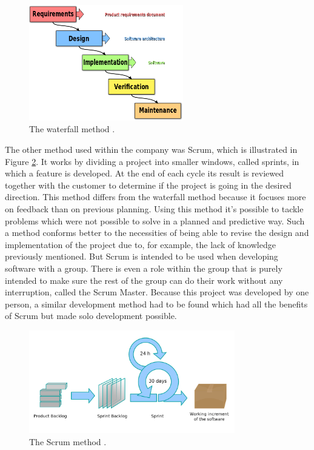 \begin{figure}[ht]
    \centering
    \includegraphics[width=0.6\textwidth]{plaatjes/waterfall-method}
    \caption{The waterfall method \cite{waterfall-image}.}
    \label{fig:waterfall-method}
\end{figure}%

The other method used within the company was Scrum, which is illustrated in Figure \ref{fig:scrum-method}. It works by dividing a project into smaller windows, called sprints, in which a feature is developed. At the end of each cycle its result is reviewed together with the customer to determine if the project is going in the desired direction. This method differs from the waterfall method because it focuses more on feedback than on previous planning. Using this method it's possible to tackle problems which were not possible to solve in a planned and predictive way. Such a method conforms better to the necessities of being able to revise the design and implementation of the project due to, for example, the lack of knowledge previously mentioned. But Scrum is intended to be used when developing software with a group. There is even a role within the group that is purely intended to make sure the rest of the group can do their work without any interruption, called the Scrum Master. Because this project was developed by one person, a similar development method had to be found which had all the benefits of Scrum but made solo development possible.

\begin{figure}[ht]
    \centering
    \includegraphics[width=0.8\textwidth]{plaatjes/scrum-method}
    \caption{The Scrum method \cite{scrum-image}.}
    \label{fig:scrum-method}
\end{figure}%


